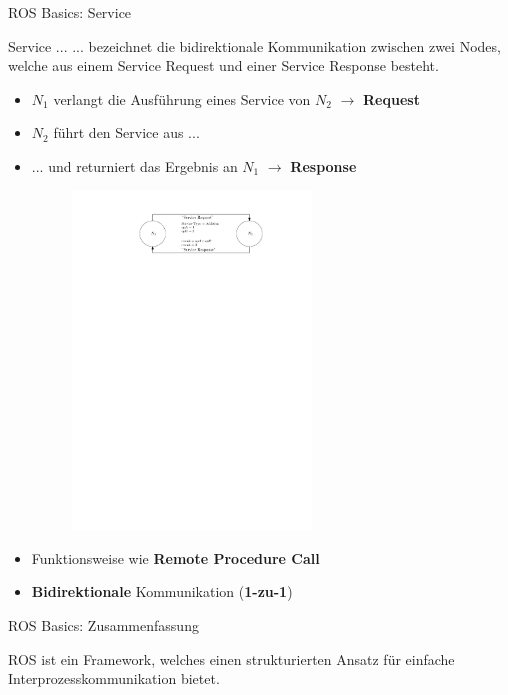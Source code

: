 \documentclass{beamer}
\begin{document}
\begin{frame}{ROS Basics: Service}
\begin{alertblock}{Service ...}
... bezeichnet die bidirektionale Kommunikation zwischen zwei Nodes, welche aus einem Service Request und einer Service Response besteht.
\end{alertblock}
\begin{itemize}
	\item $N_1$ verlangt die Ausf\"uhrung eines Service von $N_2$ $\rightarrow$ \textbf{Request}
    \item $N_2$ f\"uhrt den Service aus  ...
	\item ... und returniert das Ergebnis an $N_1$ $\rightarrow$ \textbf{Response}
	\begin{figure}[H]
		\centering
		\includegraphics[width=0.6\textwidth]{./images/ros-service.pdf}
		\label{fig:ros_service}
	\end{figure}
	\item Funktionsweise wie \textbf{Remote Procedure Call}
	\item \textbf{Bidirektionale} Kommunikation (\textbf{1-zu-1})
\end{itemize}
\end{frame}
\begin{frame}{ROS Basics: Zusammenfassung}
\begin{center}
\begin{huge}
ROS ist ein Framework, welches einen strukturierten Ansatz f\"ur einfache Interprozesskommunikation bietet.
\end{huge}
\end{center}
\end{frame}
\end{document}
